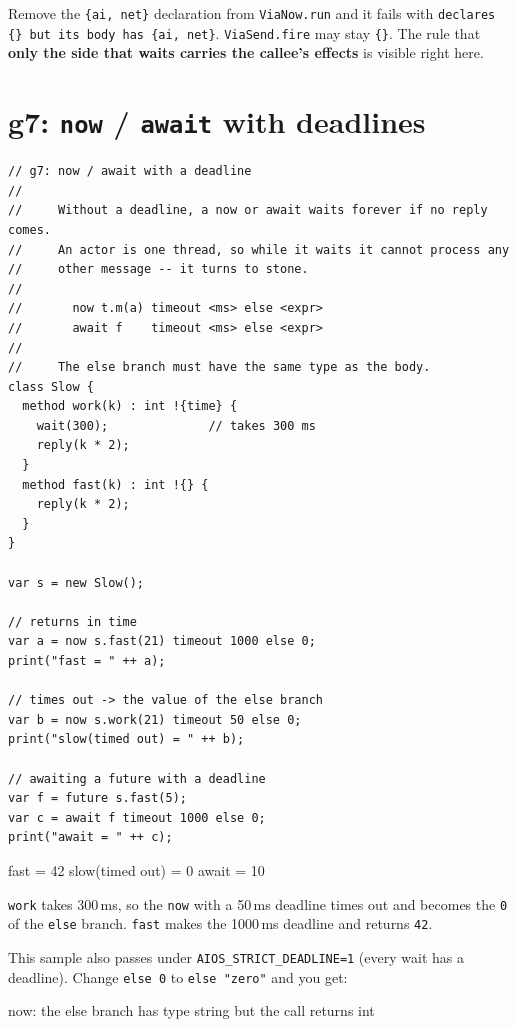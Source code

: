 \documentclass[11pt,a4paper]{article}
\newcommand{\eff}[1]{\texttt{\{#1\}}}
\begin{document}
Remove the \eff{ai, net} declaration from \texttt{ViaNow.run} and it fails with
\texttt{declares \{\} but its body has \{ai, net\}}. \texttt{ViaSend.fire} may
stay \eff{}. The rule that \textbf{only the side that waits carries the
callee's effects} is visible right here.

\section{g7: \texttt{now} / \texttt{await} with deadlines}

\begin{lstlisting}
// g7: now / await with a deadline
//
//     Without a deadline, a now or await waits forever if no reply comes.
//     An actor is one thread, so while it waits it cannot process any
//     other message -- it turns to stone.
//
//       now t.m(a) timeout <ms> else <expr>
//       await f    timeout <ms> else <expr>
//
//     The else branch must have the same type as the body.
class Slow {
  method work(k) : int !{time} {
    wait(300);              // takes 300 ms
    reply(k * 2);
  }
  method fast(k) : int !{} {
    reply(k * 2);
  }
}

var s = new Slow();

// returns in time
var a = now s.fast(21) timeout 1000 else 0;
print("fast = " ++ a);

// times out -> the value of the else branch
var b = now s.work(21) timeout 50 else 0;
print("slow(timed out) = " ++ b);

// awaiting a future with a deadline
var f = future s.fast(5);
var c = await f timeout 1000 else 0;
print("await = " ++ c);
\end{lstlisting}

\begin{term}
fast = 42
slow(timed out) = 0
await = 10
\end{term}

\texttt{work} takes 300\,ms, so the \texttt{now} with a 50\,ms deadline times
out and becomes the \texttt{0} of the \texttt{else} branch. \texttt{fast} makes
the 1000\,ms deadline and returns \texttt{42}.

This sample also passes under \texttt{AIOS\_STRICT\_DEADLINE=1} (every wait has
a deadline). Change \texttt{else 0} to \texttt{else "zero"} and you get:

\begin{term}
 now: the else branch has type string but the call returns int
\end{term}
\end{document}

